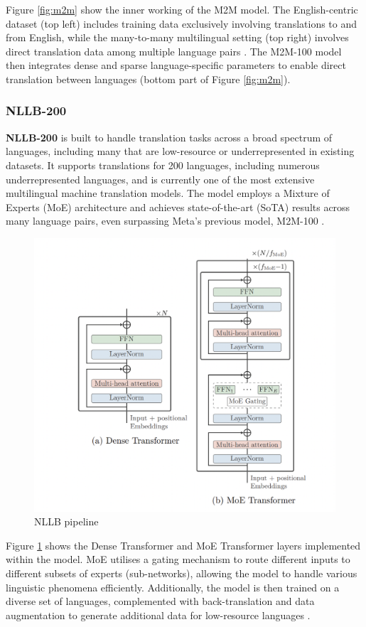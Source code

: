 \documentclass[a4paper]{article}
\begin{document}
Figure \ref{fig:m2m} show the inner working of the M2M model. The English-centric dataset (top left) includes training data exclusively involving translations to and from English, while the many-to-many multilingual setting (top right) involves direct translation data among multiple language pairs \cite{fan-2020-m2m100}. The M2M-100 model then integrates dense and sparse language-specific parameters to enable direct translation between languages (bottom part of Figure \ref{fig:m2m}).

\subsubsection{NLLB-200}

\textbf{NLLB-200} \cite{nllb200-2020} is built to handle translation tasks across a broad spectrum of languages, including many that are low-resource or underrepresented in existing datasets. It supports translations for 200 languages, including numerous underrepresented languages, and is currently one of the most extensive multilingual machine translation models. The model employs a Mixture of Experts (MoE) architecture and achieves state-of-the-art (SoTA) results across many language pairs, even surpassing Meta's previous model, M2M-100 \cite{nllb200-2020}.


\begin{figure}[htbp]
    \centering
    \includegraphics[width=0.7\linewidth]{images/nllb.png}
    \caption{NLLB pipeline \cite{nllb200-2020}}
    \label{fig:nllb}
\end{figure}

Figure \ref{fig:nllb} shows the Dense Transformer and MoE Transformer layers implemented within the model. MoE \cite{masoudnia-2012-moe} utilises a gating mechanism to route different inputs to different subsets of experts (sub-networks), allowing the model to handle various linguistic phenomena efficiently. Additionally, the model is then trained on a diverse set of languages, complemented with back-translation and data augmentation to generate additional data for low-resource languages \cite{nllb200-2020}.
\end{document}
